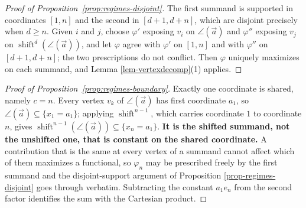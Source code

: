 \documentclass[11pt, a4paper, abstract=yes]{scrartcl}
\theoremstyle{definition}
\theoremstyle{remark}
\theoremstyle{plain}
\newcommand{\shift}{\operatorname{shift}}
\newcommand{\rasimp}{\angle}
\begin{document}
\begin{proof}[Proof of Proposition~\ref{prop:regimes-disjoint}]
The first summand is supported in coordinates \([1,n]\) and the second in \([d+1,d+n]\), which are
disjoint precisely when \(d\ge n\). Given \(i\) and \(j\), choose \(\varphi'\) exposing \(v_i\) on
\(\rasimp(\vec a)\) and \(\varphi''\) exposing \(v_j\) on \(\shift^d(\rasimp(\vec a))\), and let
\(\varphi\) agree with \(\varphi'\) on \([1,n]\) and with \(\varphi''\) on \([d+1,d+n]\); the two
prescriptions do not conflict. Then \(\varphi\) uniquely maximizes on each summand, and
Lemma \ref{lem-vertexdecomp}(1) applies.
\end{proof}

\begin{proof}[Proof of Proposition~\ref{prop:regimes-boundary}]
Exactly one coordinate is shared, namely \(c=n\). Every vertex \(v_k\) of \(\rasimp(\vec a)\) has
first coordinate \(a_1\), so \(\rasimp(\vec a)\subseteq\lbrace x_1=a_1\rbrace\); applying
\(\shift^{n-1}\), which carries coordinate \(1\) to coordinate \(n\), gives
\(\shift^{n-1}(\rasimp(\vec a))\subseteq\lbrace x_n=a_1\rbrace\). \textbf{It is the shifted summand, not
the unshifted one, that is constant on the shared coordinate.} A contribution that is the same at
every vertex of a summand cannot affect which of them maximizes a functional, so \(\varphi_n\) may be
prescribed freely by the first summand and the disjoint-support argument of
Proposition \ref{prop-regimes-disjoint} goes through verbatim. Subtracting the constant \(a_1e_n\) from
the second factor identifies the sum with the Cartesian product.
\end{proof}
\end{document}
